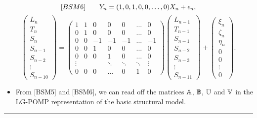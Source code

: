 \documentclass[]{article}
\providecommand{\tightlist}{%
  \setlength{\itemsep}{0pt}\setlength{\parskip}{0pt}}
\begin{document}
$$[BSM6] \quad\quad Y_n = (1,0,1,0,0,\dots, 0) X_n + \epsilon_n,$$
$$\displaystyle  \left(\begin{array}{l} L_{n} \\ T_{n} \\ S_{n} \\ S_{n-1}\\ S_{n-2} \\  \vdots \\ S_{n-10} \end{array}\right) = \left(\begin{array}{ccccccc} 1 & 1 & 0 & 0 & 0 & \ldots & 0 \\ 0 & 1 & 0 & 0 & 0 & \ldots & 0 \\ 0 & 0 & -1 & -1 & -1 & \ldots & -1\\ 0 & 0 & 1 & 0 & 0 & \ldots & 0 \\ 0 & 0 & 0 & 1 & 0 & \ldots & 0 \\ \vdots & & &\ddots & \ddots & \ddots & \vdots \\ 0 & 0 & 0 &\ldots & 0 & 1 & 0 \end{array}\right) \left(\begin{array}{l} L_{n-1} \\ T_{n-1} \\ S_{n-1} \\ S_{n-2}\\ S_{n-3} \\  \vdots \\ S_{n-11} \end{array}\right) + \left(\begin{array}{l} \xi_n \\ \zeta_n \\ \eta_n \\ 0 \\ 0 \\  \vdots \\ 0 \end{array}\right).$$

\begin{itemize}
\tightlist
\item
  From {[}BSM5{]} and {[}BSM6{]}, we can read off the matrices
  \(\mathbb{A}\), \(\mathbb{B}\), \(\mathbb{U}\) and \(\mathbb{V}\) in the LG-POMP
  representation of the basic structural model.
\end{itemize}

\begin{center}\rule{0.5\linewidth}{\linethickness}\end{center}
\end{document}
